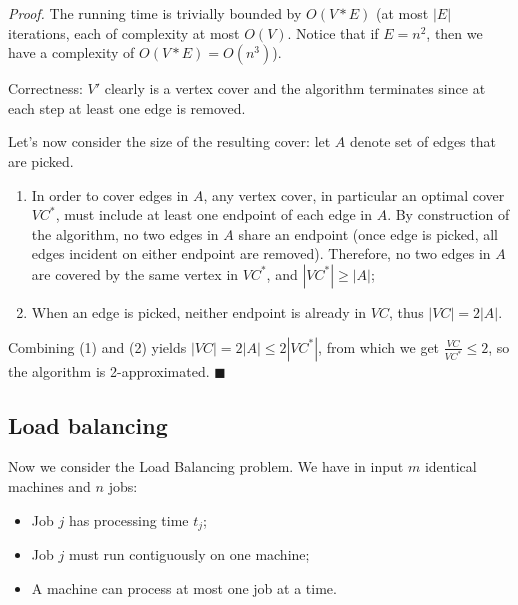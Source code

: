 
\textit{Proof.} 
The running time is trivially bounded by $O(V * E)$ (at most $|E|$ iterations, each of complexity at most $O(V)$. Notice that if $E = n^2$, then we have a complexity of $O(V * E) = O(n^3)$).

Correctness: $V'$ clearly is a vertex cover and the algorithm terminates since at each step at least one edge is removed.

Let's now consider the size of the resulting cover: let $A$ denote set of edges that are picked.
\begin{enumerate}
    \item In order to cover edges in $A$, any vertex cover, in particular an optimal cover $VC^*$, must include at least one endpoint of each edge in $A$. By construction of the algorithm, no two edges in $A$ share an endpoint (once edge is picked, all edges incident on either endpoint are removed). Therefore, no two edges in $A$ are covered by the same vertex in $VC^*$, and $|VC^*| \geq |A|$;
    \item When an edge is picked, neither endpoint is already in $VC$, thus $|VC| = 2|A|$.
\end{enumerate}

Combining (1) and (2) yields $|VC| = 2|A| \leq 2|VC^*|$, from which we get $\frac{VC}{VC^*} \leq 2$, so the algorithm is 2-approximated. $\blacksquare$

\subsection{Load balancing}
Now we consider the Load Balancing problem. We have in input $m$ identical machines and $n$ jobs:
\begin{itemize}
    \item Job $j$ has processing time $t_j$;
    \item Job $j$ must run contiguously on one machine;
    \item A machine can process at most one job at a time.
\end{itemize}




